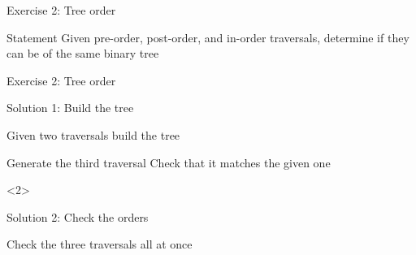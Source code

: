 \documentclass{beamer}
\begin{document}
\begin{frame}{Exercise 2: Tree order}
  \begin{overlayarea}{\textwidth}{\textheight}
  \begin{block}{Statement}
    Given pre-order, post-order, and in-order traversals, determine if they can be of the same binary tree
  \end{block}
  
  \end{overlayarea}
\end{frame}

\begin{frame}[fragile]{Exercise 2: Tree order}
  
  \begin{code}{Solution 1: Build the tree}
    \begin{PseudoCode}
Given two traversals build the tree

Generate the third traversal 
Check that it matches the given one
    \end{PseudoCode}
  \end{code}
  
  \begin{uncoverenv}<2>
  \begin{code}{Solution 2: Check the orders}
    \begin{PseudoCode}
Check the three traversals all at once 
    \end{PseudoCode}
  \end{code}
  \end{uncoverenv}
\end{frame}
\end{document}

